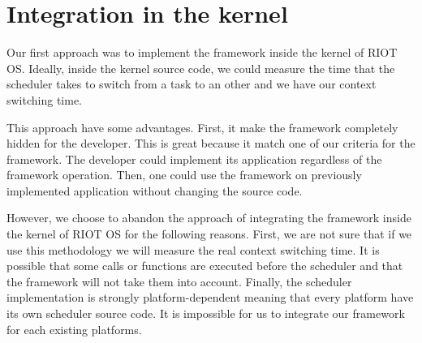 \section{Integration in the kernel}

Our first approach was to implement the framework inside the kernel of RIOT OS.
Ideally, inside the kernel source code, we could measure the time that the scheduler takes to switch from a task to an other and we have our context switching time.

This approach have some advantages.
First, it make the framework completely hidden for the developer.
This is great because it match one of our criteria for the framework.
The developer could implement its application regardless of the framework operation.
Then, one could use the framework on previously implemented application without changing the source code.

However, we choose to abandon the approach of integrating the framework inside the kernel of RIOT OS for the following reasons.
First, we are not sure that if we use this methodology we will measure the real context switching time.
It is possible that some calls or functions are executed before the scheduler and that the framework will not take them into account.
Finally, the scheduler implementation is strongly platform-dependent meaning that every platform have its own scheduler source code.
It is impossible for us to integrate our framework for each existing platforms.